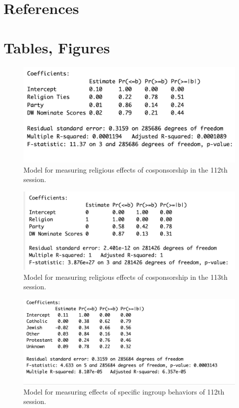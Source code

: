 \documentclass[Royal,times,sageh]{sagej}
\begin{document}
\hypertarget{references}{%
\section{References}\label{references}}

\hypertarget{tables-figures}{%
\section{Tables, Figures}\label{tables-figures}}

\begin{figure}

{\centering \includegraphics[width=0.7\linewidth]{images/112th_religion_firstmodel} 

}

\caption{Model for measuring religious effects of cosponsorship in the 112th session.\label{table1}}\label{fig:table1}
\end{figure}

\begin{figure}

{\centering \includegraphics[width=0.7\linewidth]{images/117th_religion_firstmodel} 

}

\caption{Model for measuring religious effects of cosponsorship in the 113th session. \label{table2}}\label{fig:table2}
\end{figure}

\begin{figure}

{\centering \includegraphics[width=0.7\linewidth]{images/112th_religion} 

}

\caption{Model for measuring effects of specific ingroup behaviors of 112th session. \label{table3}}\label{fig:table3}
\end{figure}
\end{document}
